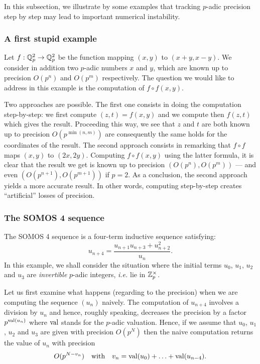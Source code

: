 \documentclass{lms}
\begin{document}
In this subsection, we illustrate by some examples that tracking
$p$-adic precision step by step may lead to important numerical
instability.

\subsubsection*{A first stupid example}

Let $f : \mathbb Q_p^2 \to \mathbb Q_p^2$ be the function mapping $(x,y)$ to $(x+y, 
x-y)$. We consider in addition two $p$-adic numbers $x$ and $y$, 
which are known up to precision $O(p^n)$ and $O(p^m)$ respectively.
The question we would like to address in this example is the
computation of $f \circ f(x,y)$.

Two approaches are possible. The first one consists in doing the 
computation step-by-step: we first compute $(z,t) = f(x,y)$ and we 
compute then $f(z,t)$ which gives the result. Proceeding this way, we 
see that $z$ and $t$ are both known up to precision $O(p^{\min(n,m)})$ 
are consequently the same holds for the coordinates of the result.
The second approach consists in remarking that $f \circ f$ maps
$(x,y)$ to $(2x, 2y)$. Computing $f \circ f(x,y)$ using the latter
formula, it is clear that the result we get is known up to precision
$(O(p^n), O(p^m))$ --- and even $(O(p^{n+1}), O(p^{m+1}))$ if $p = 2$.
As a conclusion, the second approach yields a more accurate result.
In other words, computing step-by-step creates ``artificial'' losses 
of precision.

\subsubsection*{The SOMOS 4 sequence}

The SOMOS 4 sequence is a four-term inductive sequence satisfying:
$$u_{n+4} = \frac{u_{n+1} u_{n+3} + u_{n+2}^2}{u_n}.$$
In this example, we shall consider the situation where the initial
terms $u_0$, $u_1$, $u_2$ and $u_3$ are \emph{invertible} $p$-adic 
integers, \emph{i.e.} lie in $\mathbb Z_p^\times$.

Let us first examine what happens (regarding to the precision) when
we are computing the sequence $(u_n)$ naively. The computation of
$u_{n+4}$ involves a division by $u_n$ and hence, roughly speaking,
decreases the precision by a factor $p^{\text{\rm val}(u_n)}$ where $\text{\rm val}$
stands for the $p$-adic valuation. Hence, if we assume that $u_0$,
$u_1$, $u_2$ and $u_3$ are given with precision $O(p^N)$ then the
naive computation returns the value of $u_n$ with precision
\begin{equation}
\label{eq:SOMOS}
O(p^{N-v_n})
\quad \text{with}\quad
v_n = \text{\rm val}(u_0) + \ldots + \text{\rm val}(u_{n-4}).
\end{equation}
\end{document}
